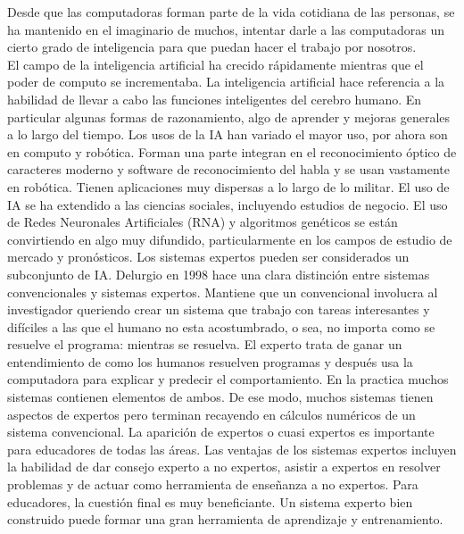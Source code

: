 \documentclass[runningheads,a4paper]{llncs}
\begin{document}
  Desde que las computadoras forman parte de la vida cotidiana de las personas,
  se ha mantenido en el imaginario de muchos, intentar darle a las computadoras
  un cierto grado de inteligencia para que puedan hacer el trabajo por
  nosotros.\\
  
  El campo de la inteligencia artificial ha crecido rápidamente mientras que el
  poder de computo se incrementaba. La inteligencia artificial hace referencia a
  la habilidad de llevar a cabo las funciones inteligentes del cerebro humano. En
  particular algunas formas de razonamiento, algo de aprender y mejoras generales
  a lo largo del tiempo. Los usos de la IA han variado el mayor uso, por ahora
  son en computo y robótica. Forman una parte integran en el reconocimiento
  óptico de caracteres moderno y software de reconocimiento del habla y se usan
  vastamente en robótica. Tienen aplicaciones muy dispersas a lo largo de lo
  militar. El uso de IA se ha extendido a las ciencias sociales, incluyendo
  estudios de negocio. El uso de Redes Neuronales Artificiales (RNA) y algoritmos
  genéticos se están convirtiendo en algo muy difundido, particularmente en los
  campos de estudio de mercado y pronósticos.\cite{IN1} Los sistemas expertos
  pueden ser considerados un subconjunto de IA. Delurgio en 1998 hace una clara
  distinción entre sistemas convencionales y sistemas expertos. Mantiene que un
  convencional involucra al investigador queriendo crear un sistema que trabajo
  con tareas interesantes y difíciles a las que el humano no esta acostumbrado, o
  sea, no importa como se resuelve el programa: mientras se resuelva. El experto
  trata de ganar un entendimiento de como los humanos resuelven programas y
  después usa la computadora para explicar y predecir el comportamiento. En la
  practica muchos sistemas contienen elementos de ambos. De ese modo, muchos
  sistemas tienen aspectos de expertos pero terminan recayendo en cálculos
  numéricos de un sistema convencional.  La aparición de expertos o cuasi
  expertos es importante para educadores de todas las áreas. Las ventajas de los
  sistemas expertos incluyen la habilidad de dar consejo experto a no expertos,
  asistir a expertos en resolver problemas y de actuar como herramienta de
  enseñanza a no expertos\cite{IN2}. Para educadores, la cuestión final es muy
  beneficiante. Un sistema experto bien construido puede formar una gran
  herramienta de aprendizaje y entrenamiento.
  
\end{document}
